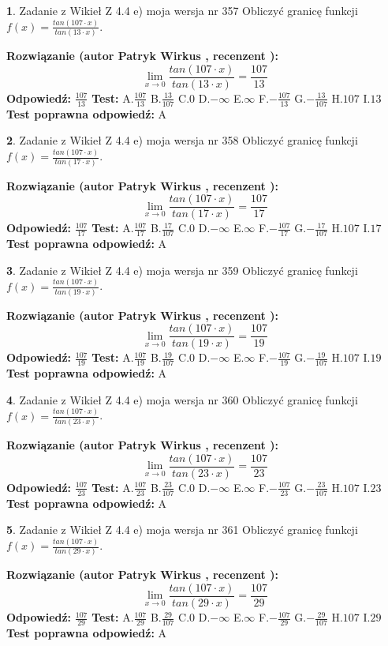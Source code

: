 \documentclass[12pt, a4paper]{article}
\theoremstyle{definition} %
\newtheorem{zad}{}
\newcommand{\zadStart}[1]{\begin{zad}#1\newline}
\newcommand{\zadStop}{\end{zad}}
\newcommand{\rozwStart}[2]{\noindent \textbf{Rozwiązanie (autor #1 , recenzent #2): }\newline}
\newcommand{\rozwStop}{\newline}
\newcommand{\odpStart}{\noindent \textbf{Odpowiedź:}\newline}
\newcommand{\odpStop}{\newline}
\newcommand{\testStart}{\noindent \textbf{Test:}\newline}
\newcommand{\testStop}{\newline}
\newcommand{\kluczStart}{\noindent \textbf{Test poprawna odpowiedź:}\newline}
\newcommand{\kluczStop}{\newline}
\begin{document}
\zadStart{Zadanie z Wikieł Z 4.4 e) moja wersja nr 357}
Obliczyć granicę funkcji $f(x)=\frac{tan(107\cdot x)}{tan(13\cdot x)}$.
\zadStop
\rozwStart{Patryk Wirkus}{}
$$\lim\limits_{x\to 0}\frac{tan(107\cdot x)}{tan(13\cdot x)}=
\frac{107}{13}$$
\rozwStop
\odpStart
$\frac{107}{13}$
\odpStop
\testStart
A.$\frac{107}{13}$
B.$\frac{13}{107}$
C.$0$
D.$-\infty$
E.$\infty$
F.$-\frac{107}{13}$
G.$-\frac{13}{107}$
H.$107$
I.$13$
\testStop
\kluczStart
A
\kluczStop



\zadStart{Zadanie z Wikieł Z 4.4 e) moja wersja nr 358}
Obliczyć granicę funkcji $f(x)=\frac{tan(107\cdot x)}{tan(17\cdot x)}$.
\zadStop
\rozwStart{Patryk Wirkus}{}
$$\lim\limits_{x\to 0}\frac{tan(107\cdot x)}{tan(17\cdot x)}=
\frac{107}{17}$$
\rozwStop
\odpStart
$\frac{107}{17}$
\odpStop
\testStart
A.$\frac{107}{17}$
B.$\frac{17}{107}$
C.$0$
D.$-\infty$
E.$\infty$
F.$-\frac{107}{17}$
G.$-\frac{17}{107}$
H.$107$
I.$17$
\testStop
\kluczStart
A
\kluczStop



\zadStart{Zadanie z Wikieł Z 4.4 e) moja wersja nr 359}
Obliczyć granicę funkcji $f(x)=\frac{tan(107\cdot x)}{tan(19\cdot x)}$.
\zadStop
\rozwStart{Patryk Wirkus}{}
$$\lim\limits_{x\to 0}\frac{tan(107\cdot x)}{tan(19\cdot x)}=
\frac{107}{19}$$
\rozwStop
\odpStart
$\frac{107}{19}$
\odpStop
\testStart
A.$\frac{107}{19}$
B.$\frac{19}{107}$
C.$0$
D.$-\infty$
E.$\infty$
F.$-\frac{107}{19}$
G.$-\frac{19}{107}$
H.$107$
I.$19$
\testStop
\kluczStart
A
\kluczStop



\zadStart{Zadanie z Wikieł Z 4.4 e) moja wersja nr 360}
Obliczyć granicę funkcji $f(x)=\frac{tan(107\cdot x)}{tan(23\cdot x)}$.
\zadStop
\rozwStart{Patryk Wirkus}{}
$$\lim\limits_{x\to 0}\frac{tan(107\cdot x)}{tan(23\cdot x)}=
\frac{107}{23}$$
\rozwStop
\odpStart
$\frac{107}{23}$
\odpStop
\testStart
A.$\frac{107}{23}$
B.$\frac{23}{107}$
C.$0$
D.$-\infty$
E.$\infty$
F.$-\frac{107}{23}$
G.$-\frac{23}{107}$
H.$107$
I.$23$
\testStop
\kluczStart
A
\kluczStop



\zadStart{Zadanie z Wikieł Z 4.4 e) moja wersja nr 361}
Obliczyć granicę funkcji $f(x)=\frac{tan(107\cdot x)}{tan(29\cdot x)}$.
\zadStop
\rozwStart{Patryk Wirkus}{}
$$\lim\limits_{x\to 0}\frac{tan(107\cdot x)}{tan(29\cdot x)}=
\frac{107}{29}$$
\rozwStop
\odpStart
$\frac{107}{29}$
\odpStop
\testStart
A.$\frac{107}{29}$
B.$\frac{29}{107}$
C.$0$
D.$-\infty$
E.$\infty$
F.$-\frac{107}{29}$
G.$-\frac{29}{107}$
H.$107$
I.$29$
\testStop
\kluczStart
A
\kluczStop
\end{document}
